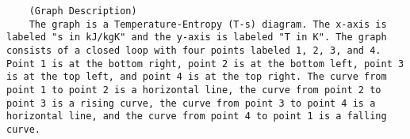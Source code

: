 

\item[a)] 
    \begin{verbatim}
    (Graph Description)
    The graph is a Temperature-Entropy (T-s) diagram. The x-axis is labeled "s in kJ/kgK" and the y-axis is labeled "T in K". The graph consists of a closed loop with four points labeled 1, 2, 3, and 4. Point 1 is at the bottom right, point 2 is at the bottom left, point 3 is at the top left, and point 4 is at the top right. The curve from point 1 to point 2 is a horizontal line, the curve from point 2 to point 3 is a rising curve, the curve from point 3 to point 4 is a horizontal line, and the curve from point 4 to point 1 is a falling curve.
    \end{verbatim}